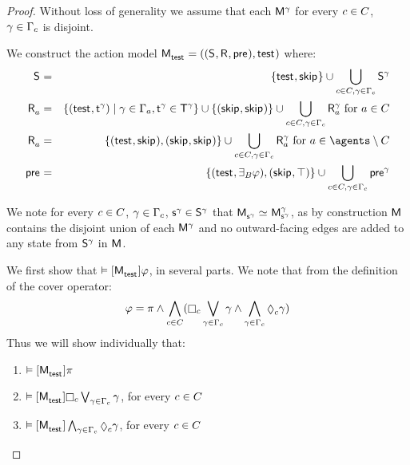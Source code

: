 \begin{proof}
Without loss of generality we assume that each $\aModel[\gamma]$ for every $\agentC \in \agentsC$, $\gamma \in \Gamma_\agentC$ is disjoint.

We construct the action model $\aPModelAndTuple{\aStateTest}$ where:
\begin{eqnarray*}
    \aStates &=& \{\aStateTest, \aStateSkip\} \cup \bigcup_{\agentC \in \agentsC, \gamma \in \Gamma_\agentC} \aStates[\gamma]\\
    \aAccessibilityA &=& \{(\aStateTest, \aStateT[\gamma]) \mid \gamma \in \Gamma_\agentA, \aStateT[\gamma] \in \aStatesT[\gamma]\} \cup \{(\aStateSkip, \aStateSkip)\} \cup \bigcup_{\agentC \in \agentsC, \gamma \in \Gamma_\agentC} \aAccessibilityA[\gamma] \text{ for } \agentA \in \agentsC\\
    \aAccessibilityA &=& \{(\aStateTest, \aStateSkip), (\aStateSkip, \aStateSkip)\} \cup \bigcup_{\agentC \in \agentsC, \gamma \in \Gamma_\agentC} \aAccessibilityA[\gamma] \text{ for } \agentA \in \agents \setminus \agentsC\\
    \aPrecondition &=& \{(\aStateTest, \someactsBs \phi), (\aStateSkip, \top)\} \cup \bigcup_{\agentC \in \agentsC, \gamma \in \Gamma_\agentC} \aPrecondition[\gamma]
\end{eqnarray*}

We note for every $\agentC \in \agentsC$, $\gamma \in \Gamma_\agentC$, $\aStateS[\gamma] \in \aStates[\gamma]$ that $\aPModel{\aStateS[\gamma]} \bisimilar \aPModel[\gamma]{\aStateS[\gamma]}$, as by construction $\aModel$ contains the disjoint union of each $\aModel[\gamma]$ and no outward-facing edges are added to any state from $\aStates[\gamma]$ in $\aModel$.

We first show that $\entails \actionA{\aPModel{\aStateTest}} \phi$, in several parts.
We note that from the definition of the cover operator:
$$
\phi = \pi \land \bigwedge_{\agentC \in \agentsC} (\necessaryC \bigvee_{\gamma \in \Gamma_\agentC} \gamma \land \bigwedge_{\gamma \in \Gamma_\agentC} \possibleC \gamma)
$$
Thus we will show individually that:
\begin{enumerate}
\item $\entails \actionA{\aPModel{\aStateTest}} \pi$
\item $\entails \actionA{\aPModel{\aStateTest}} \necessaryC \bigvee_{\gamma \in \Gamma_\agentC} \gamma$, for every $\agentC \in \agentsC$
\item $\entails \actionA{\aPModel{\aStateTest}} \bigwedge_{\gamma \in \Gamma_\agentC} \possibleC \gamma$, for every $\agentC \in \agentsC$
\end{enumerate}


\end{proof}
